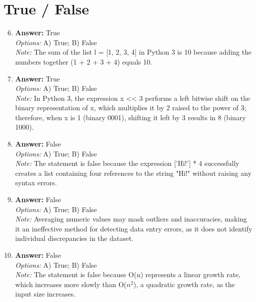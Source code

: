 \documentclass[12pt]{article}
\begin{document}
\section*{True / False}
\begin{enumerate}[label=\arabic*.]
\setcounter{enumi}{5}
\item \textbf{Answer:} True
\\ \textit{Options:} A) True; B) False
\\ \textit{Note:} The sum of the list l = [1, 2, 3, 4] in Python 3 is 10 because adding the numbers together (1 + 2 + 3 + 4) equals 10.
\item \textbf{Answer:} True
\\ \textit{Options:} A) True; B) False
\\ \textit{Note:} In Python 3, the expression x \textless{}\textless{} 3 performs a left bitwise shift on the binary representation of x, which multiplies it by 2 raised to the power of 3; therefore, when x is 1 (binary 0001), shifting it left by 3 results in 8 (binary 1000).
\item \textbf{Answer:} False
\\ \textit{Options:} A) True; B) False
\\ \textit{Note:} The statement is false because the expression ['Hi!'] * 4 successfully creates a list containing four references to the string "Hi!" without raising any syntax errors.
\item \textbf{Answer:} False
\\ \textit{Options:} A) True; B) False
\\ \textit{Note:} Averaging numeric values may mask outliers and inaccuracies, making it an ineffective method for detecting data entry errors, as it does not identify individual discrepancies in the dataset.
\item \textbf{Answer:} False
\\ \textit{Options:} A) True; B) False
\\ \textit{Note:} The statement is false because O(n) represents a linear growth rate, which increases more slowly than O($n^2$), a quadratic growth rate, as the input size increases.
\end{enumerate}
\end{document}
